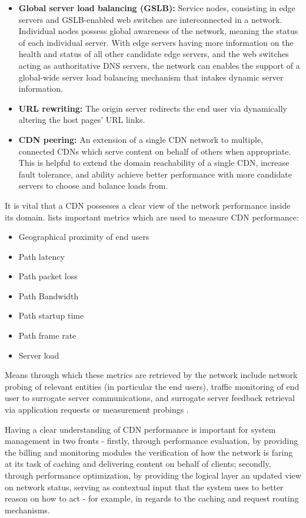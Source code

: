 \begin{itemize}
    \item \textbf{Global server load balancing (GSLB):} Service nodes, consisting in edge servers and GSLB-enabled web switches are interconnected in a network.
        Individual nodes possess global awareness of the network, meaning the status of each individual server.
        With edge servers having more information on the health and status of all other candidate edge servers, and the web switches acting as authoritative DNS servers, the network can enables the support of a global-wide server load balancing mechanism that intakes dynamic server information.
    \item \textbf{URL rewriting:} The origin server redirects the end user via dynamically altering the host pages' URL links.
    \item \textbf{CDN peering:} An extension of a single CDN network to multiple, connected CDNs which serve content on behalf of others when appropriate.
        This is helpful to extend the domain reachability of a single CDN, increase fault tolerance, and ability achieve better performance with more candidate servers to choose and balance loads from.
\end{itemize}

    It is vital that a CDN possesses a clear view of the network performance inside its domain.
    \cite{cdn-survey} lists important metrics which are used to measure CDN performance:

    \begin{itemize}
        \item Geographical proximity of end users
        \item Path latency
        \item Path packet loss
        \item Path Bandwidth
        \item Path startup time
        \item Path frame rate
        \item Server load
    \end{itemize}

    Means through which these metrics are retrieved by the network include network probing of relevant entities (in particular the end users), traffic monitoring of end user to surrogate server communications, and surrogate server feedback retrieval via application requests or measurement probings \cite{cdn-survey} \cite{akamai-report}.

    Having a clear understanding of CDN performance is important for system management in two fronts - firstly, through performance evaluation, by providing the billing and monitoring modules the verification of how the network is faring at its task of caching and delivering content on behalf of clients; secondly, through performance optimization, by providing the logical layer an updated view on network status, serving as contextual input that the system uses to better reason on how to act - for example, in regards to the caching and request routing mechanisms.

